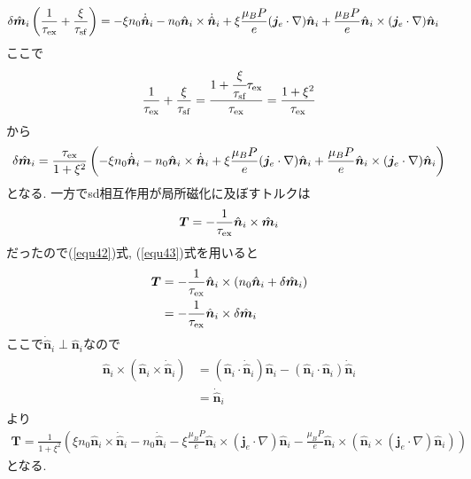 \documentclass[uplatex,a4j,11pt,dvipdfmx]{jsarticle}
\begin{document}
\begin{align}
  \delta\hat{\bm m}_i\left(\frac{1}{\tau_{\rm ex}}+\frac{\xi}{\tau_{\rm sf}}\right)
    &=-\xi n_0\dot{\hat{\bm n}}_i-n_0\hat{\bm n}_i\times\dot{\hat{\bm n}}_i
    +\xi\frac{\mu_BP}{e}({\bm j}_e\cdot\nabla)\hat{\bm n}_i+\frac{\mu_BP}{e}\hat{\bm n}_i\times({\bm j}_e\cdot\nabla)\hat{\bm n}_i
\end{align}
ここで
\begin{align}
  \frac{1}{\tau_{\rm ex}}+\frac{\xi}{\tau_{\rm sf}}=\frac{1+\cfrac{\xi}{\tau_{\rm sf}}\tau_{\rm ex}}{\tau_{\rm ex}}=\frac{1+\xi^2}{\tau_{\rm ex}}
\end{align}
から
\begin{align}
  \label{equ43}
  \delta\hat{\bm m}_i=\frac{\tau_{\rm ex}}{1+\xi^2}\left(
    -\xi n_0\dot{\hat{\bm n}}_i-n_0\hat{\bm n}_i\times\dot{\hat{\bm n}}_i
    +\xi\frac{\mu_BP}{e}({\bm j}_e\cdot\nabla)\hat{\bm n}_i+\frac{\mu_BP}{e}\hat{\bm n}_i\times({\bm j}_e\cdot\nabla)\hat{\bm n}_i
  \right)
\end{align}
となる.
一方でsd相互作用が局所磁化に及ぼすトルクは
\begin{align}
  {\bm T}=-\frac{1}{\tau_{\rm ex}}\hat{\bm n}_i\times\hat{\bm m}_i
\end{align}
だったので(\ref{equ42})式, (\ref{equ43})式を用いると
\begin{align}
  \begin{split}
    {\bm T}&=-\frac{1}{\tau_{\rm ex}}\hat{\bm n}_i\times(n_0\hat{\bm n}_i+\delta\hat{\bm m}_i)\\
    &=-\frac{1}{\tau_{\rm ex}}\hat{\bm n}_i\times\delta\hat{\bm m}_i
  \end{split}
\end{align}
ここで$\dot{\hat{\bm n}}_i\perp\hat{\bm n}_i$なので
\begin{align}
  \begin{split}
    \hat{\bm n}_i\times(\hat{\bm n}_i\times\dot{\hat{\bm n}}_i)&=(\hat{\bm n}_i\cdot\dot{\hat{\bm n}}_i)\hat{\bm n}_i-(\hat{\bm n}_i\cdot\hat{\bm n}_i)\dot{\hat{\bm n}}_i\\
    &=\dot{\hat{\bm n}}_i
  \end{split}
\end{align}
より
\begin{align}
  {\bm T}=\frac{1}{1+\xi^2}\left(
    \xi n_0\hat{\bm n}_i\times\dot{\hat{\bm n}}_i
    -n_0\dot{\hat{\bm n}}_i
    -\xi\frac{\mu_BP}{e}\hat{\bm n}_i\times({\bm j}_e\cdot\nabla)\hat{\bm n}_i-\frac{\mu_BP}{e}\hat{\bm n}_i\times\left(\hat{\bm n}_i\times({\bm j}_e\cdot\nabla)\hat{\bm n}_i\right)
    \right)
\end{align}
となる.

\end{document}
